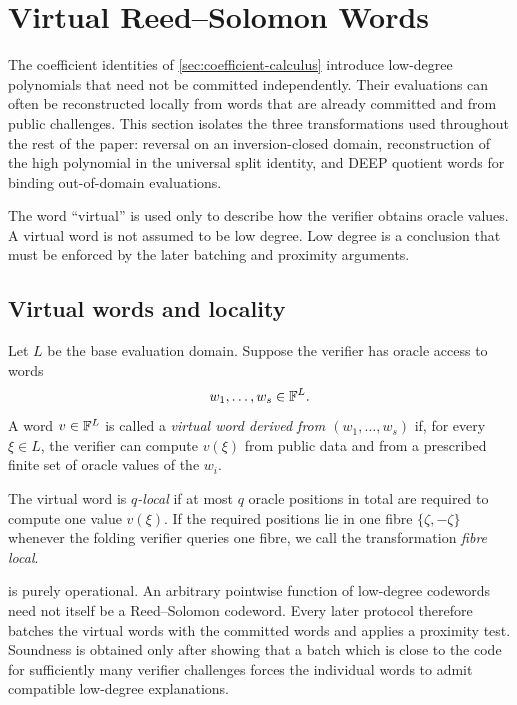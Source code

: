 \section{Virtual Reed--Solomon Words}
\label{sec:virtual-oracles}

The coefficient identities of \cref{sec:coefficient-calculus} introduce low-degree polynomials that need not be committed independently.  Their evaluations can often be reconstructed locally from words that are already committed and from public challenges.  This section isolates the three transformations used throughout the rest of the paper: reversal on an inversion-closed domain, reconstruction of the high polynomial in the universal split identity, and DEEP quotient words for binding out-of-domain evaluations.

The word ``virtual'' is used only to describe how the verifier obtains oracle values.  A virtual word is not assumed to be low degree.  Low degree is a conclusion that must be enforced by the later batching and proximity arguments.

\subsection{Virtual words and locality}
\label{sec:virtual-locality}

\begin{definition}
\label{def:virtual-word}
Let $L$ be the base evaluation domain.  Suppose the verifier has oracle access to words
\[
  w_1,\ldots,w_s\in\mathbb{F}^L.
\]
A word $v\in\mathbb{F}^L$ is called a \emph{virtual word derived from $(w_1,\ldots,w_s)$} if, for every $\xi\in L$, the verifier can compute $v(\xi)$ from public data and from a prescribed finite set of oracle values of the $w_i$.

The virtual word is \emph{$q$-local} if at most $q$ oracle positions in total are required to compute one value $v(\xi)$.  If the required positions lie in one fibre $\{\zeta,-\zeta\}$ whenever the folding verifier queries one fibre, we call the transformation \emph{fibre local}.
\end{definition}

\begin{remark}
\label{rem:virtual-not-low-degree}
 is purely operational.  An arbitrary pointwise function of low-degree codewords need not itself be a Reed--Solomon codeword.  Every later protocol therefore batches the virtual words with the committed words and applies a proximity test.  Soundness is obtained only after showing that a batch which is close to the code for sufficiently many verifier challenges forces the individual words to admit compatible low-degree explanations.
\end{remark}

